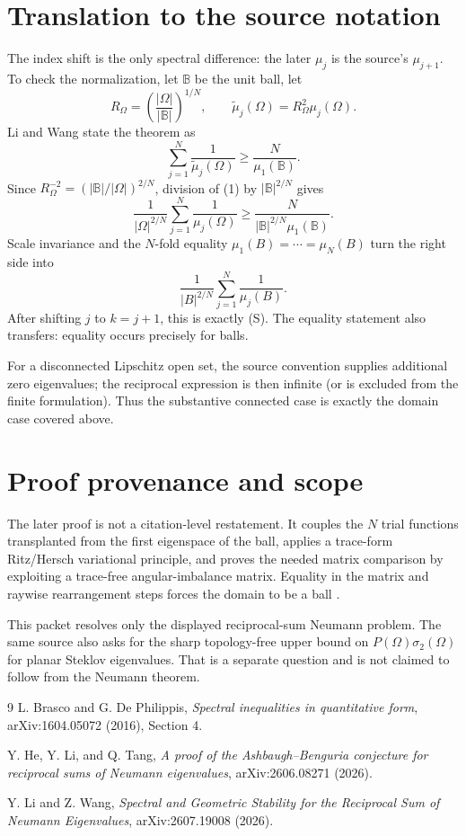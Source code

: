 \documentclass[11pt]{article}
\begin{document}
\section*{Translation to the source notation}
The index shift is the only spectral difference:
the later $\mu_j$ is the source's $\mu_{j+1}$.  To check the normalization,
let $\mathbb B$ be the unit ball, let
\[
 R_\Omega=\left(\frac{|\Omega|}{|\mathbb B|}\right)^{1/N},
 \qquad \widetilde\mu_j(\Omega)=R_\Omega^2\mu_j(\Omega).
\]
Li and Wang state the theorem as
\[
 \sum_{j=1}^{N}\frac{1}{\widetilde\mu_j(\Omega)}
 \geq \frac{N}{\mu_1(\mathbb B)}.                  \tag{1}
\]
Since $R_\Omega^{-2}=(|\mathbb B|/|\Omega|)^{2/N}$,
division of (1) by $|\mathbb B|^{2/N}$ gives
\[
 \frac{1}{|\Omega|^{2/N}}
 \sum_{j=1}^{N}\frac{1}{\mu_j(\Omega)}
 \geq
 \frac{N}{|\mathbb B|^{2/N}\mu_1(\mathbb B)}.
\]
Scale invariance and the $N$-fold equality
$\mu_1(B)=\cdots=\mu_N(B)$ turn the right side into
\[
 \frac{1}{|B|^{2/N}}\sum_{j=1}^{N}\frac{1}{\mu_j(B)}.
\]
After shifting $j$ to $k=j+1$, this is exactly (S).  The equality statement
also transfers: equality occurs precisely for balls.

For a disconnected Lipschitz open set, the source convention supplies
additional zero eigenvalues; the reciprocal expression is then infinite (or
is excluded from the finite formulation).  Thus the substantive connected
case is exactly the domain case covered above.

\section*{Proof provenance and scope}
The later proof is not a citation-level restatement.  It couples the $N$
trial functions transplanted from the first eigenspace of the ball, applies a
trace-form Ritz/Hersch variational principle, and proves the needed matrix
comparison by exploiting a trace-free angular-imbalance matrix.  Equality in
the matrix and raywise rearrangement steps forces the domain to be a ball
\cite{HLT}.

This packet resolves only the displayed reciprocal-sum Neumann problem.  The
same source also asks for the sharp topology-free upper bound on
$P(\Omega)\sigma_2(\Omega)$ for planar Steklov eigenvalues.  That is a
separate question and is not claimed to follow from the Neumann theorem.

\begin{thebibliography}{9}
L. Brasco and G. De Philippis,
\emph{Spectral inequalities in quantitative form},
arXiv:1604.05072 (2016), Section 4.

Y. He, Y. Li, and Q. Tang,
\emph{A proof of the Ashbaugh--Benguria conjecture for reciprocal sums of
Neumann eigenvalues}, arXiv:2606.08271 (2026).

Y. Li and Z. Wang,
\emph{Spectral and Geometric Stability for the Reciprocal Sum of Neumann
Eigenvalues}, arXiv:2607.19008 (2026).
\end{thebibliography}
\end{document}
